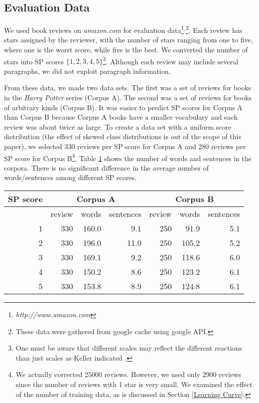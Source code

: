 \documentclass[japanese]{jnlp_1.3d}
\begin{document}
\subsection{Evaluation Data}
\label{eval}
We used book reviews on \textit{amazon.com} for evaluation data\footnote{\textit{http://www.amazon.com}}$^,$\footnote{These data were gathered from google cache using google API.}. Each review has stars assigned by the reviewer, with the number of stars ranging from one to five, where one is the worst score, while five is the best. We converted the number of stars into SP scores $\{1,2,3,4,5\}$\footnote{One must be aware that different scales may reflect the different reactions than just scales as Keller indicated \cite{Keller05}.}. Although each review may include several paragraphs, we did not exploit paragraph information.
 
From these data, we made two data sets. The first was a set of reviews for books in the \textit{Harry Potter} series (Corpus A). The second was a set of reviews for books of arbitrary kinds (Corpus B). It was easier to predict SP scores for Corpus A than Corpus B because Corpus A books have a smaller vocabulary and each review was about twice as large. To create a data set with a uniform score distribution (the effect of skewed class distributions is out of the scope of this paper), we selected 330 reviews per SP score for Corpus A and 280 reviews per SP score for Corpus B\footnote{We actually corrected 25000 reviews. However, we used only 2900 reviews since the number of reviews with 1 star is very small. We examined the effect of the number of training data, as is discussed in Section \ref{Learning Curve}.}. Table \ref{hoge} shows the number of words and sentences in the corpora. There is no significant difference in the average number of words/sentences among different SP scores. 

\begin{table}[htb]
\label{hoge}
	  \begin{center}
  \begin{tabular}{|r|rrr|rrr|} \hline
  SP score & \multicolumn{3}{|c|}{Corpus A} & \multicolumn{3}{|c|}{Corpus B} \\ \hline
  &  review & words & sentences & review & words & sentences\\ \hline
1 & 330 & 160.0 & 9.1  & 250	& 91.9	 & 5.1 \\
2 & 330	& 196.0 & 11.0 & 250	& 105.2 & 5.2 \\
3 & 330	& 169.1 & 9.2  & 250	& 118.6 & 6.0 \\
4 & 330 & 150.2 & 8.6  & 250	& 123.2 & 6.1 \\ 
5 & 330 & 153.8 & 8.9  & 250	& 124.8 & 6.1 \\ \hline
  \end{tabular}
\end{center}
\end{table}
\end{document}
